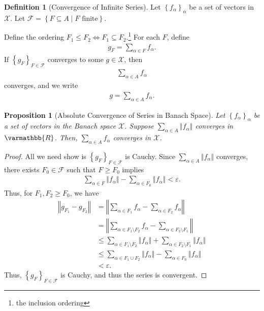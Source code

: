 \documentclass[10pt]{extarticle}
\newcommand{\R}{\mathbb{R}}
\newcommand{\norm}[1]{\left\Vert #1\right\Vert}
\newcommand{\set}[1]{\left\{#1\right\}}
\newcommand{\ve}{\varepsilon}
\theoremstyle{plain}
\newtheorem*{proposition}{Proposition}
\theoremstyle{definition}
\newtheorem*{definition}{Definition}
\theoremstyle{note}
\renewcommand*{\mathbb}[1]{\varmathbb{#1}}
\renewcommand{\newline}{\hfill\break}
\begin{document}
\begin{definition}[Convergence of Infinite Series]
  Let $\set{f_{\alpha}}_{\alpha}$ be a set of vectors in $\mathcal{X}$. Let $\mathcal{F} = \set{F\subseteq A\mid F\text{ finite}}$.\newline

  Define the ordering $F_1\leq F_2 \Leftrightarrow F_1 \subseteq F_2$.\footnote{the inclusion ordering} For each $F$, define
  \begin{align*}
    g_F = \sum_{\alpha \in F}f_{\alpha}.
  \end{align*}
  If $\set{g_F}_{F\in \mathcal{F}}$ converges to some $g\in \mathcal{X}$, then
  \begin{align*}
    \sum_{\alpha \in A}f_{\alpha}
  \end{align*}
  converges, and we write
  \begin{align*}
    g = \sum_{\alpha \in A}f_{\alpha}.
  \end{align*}
\end{definition}
\begin{proposition}[Absolute Convergence of Series in Banach Space]
  Let $\set{f_{\alpha}}_{\alpha}$ be a set of vectors in the Banach space $\mathcal{X}$. Suppose $\displaystyle \sum_{\alpha \in A}\norm{f_{\alpha}}$ converges in $\R$. Then, $\sum_{\alpha \in A}f_{\alpha}$ converges in $\mathcal{X}$.
\end{proposition}
\begin{proof}
  All we need show is $\set{g_{F}}_{F\in \mathcal{F}}$ is Cauchy. Since $\displaystyle \sum_{\alpha \in A}\norm{f_{\alpha}}$ converges, there exists $F_0\in \mathcal{F}$ such that $F\geq F_{0}$ implies
  \begin{align*}
    \sum_{\alpha \in F} \norm{f_{\alpha}} - \sum_{\alpha \in F_{0}}\norm{f_{\alpha}} < \ve.
  \end{align*}
  Thus, for $F_1,F_2 \geq F_0$, we have
  \begin{align*}
    \norm{g_{F_1} - g_{F_2}} &= \norm{\sum_{\alpha \in F_1}f_{\alpha} - \sum_{\alpha \in F_2}f_{\alpha}}\\
                             &= \norm{\sum_{\alpha \in F_1\setminus F_2}f_{\alpha} - \sum_{\alpha \in F_2\setminus F_1}}\\
                             &\leq \sum_{\alpha \in F_{1}\setminus F_2} \norm{f_{\alpha}} + \sum_{\alpha \in F_2\setminus F_1}\norm{f_{\alpha}}\\
                             &\leq \sum_{\alpha \in F_1\cup F_2}\norm{f_{\alpha}} - \sum_{\alpha \in F_0}\norm{f_{\alpha}}\\
                             &< \ve.
  \end{align*}
  Thus, $\set{g_{F}}_{F\in \mathcal{F}}$ is Cauchy, and thus the series is convergent.
\end{proof}
\end{document}

